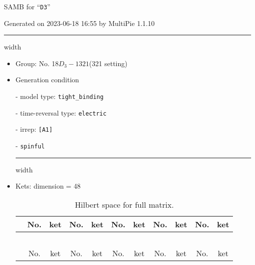 \documentclass[fleqn,10pt,landscape]{article}
\begin{document}
\setcounter{MaxMatrixCols}{16}

\setlength{\baselineskip}{16pt}
\footnotesize
\begin{center}
\LARGE
SAMB for ``\texttt{D3}''
\end{center}
\begin{flushright}
Generated on 2023-06-18 16:55 by MultiPie 1.1.10
\end{flushright}
\vspace{1cm}


 \hfil \hrule height 1mm width \textwidth \hfil

\begin{itemize}
\item Group: No. 18\quad$D_{3}-1$\quad$321$\quad(321 setting)\quad[ trigonal ]

\vspace{5mm}

\item Generation condition

\quad - model type: \texttt{tight_binding}

\quad - time-reversal type: \texttt{electric}

\quad - irrep: \texttt{[A1]}

\quad - \texttt{spinful}


 \hfil \hrule height 1mm width \textwidth \hfil

\item Kets: dimension = 48
\begin{center}
\renewcommand{\arraystretch}{1.3}
\begin{longtable}{c|cc|cc|cc|cc|cc}
\caption{Hilbert space for full matrix.}
 \\
 \hline \hline
 & No. & ket & No. & ket & No. & ket & No. & ket & No. & ket \\ \hline \endfirsthead

\multicolumn{10}{l}{\tablename\ \thetable{}} \\
 \hline \hline
 & No. & ket & No. & ket & No. & ket & No. & ket & No. & ket \\ \hline \endhead


\end{longtable}
\end{center}
\end{itemize}
\end{document}
